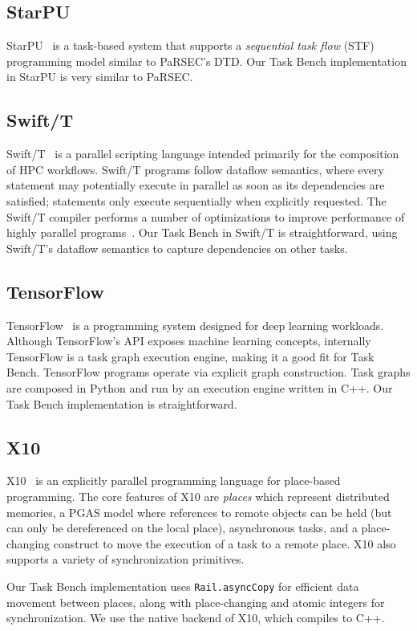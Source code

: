 \subsection{StarPU}

StarPU~\cite{StarPU11} is a task-based system that supports a \emph{sequential task flow} (STF)
programming model similar to PaRSEC's DTD. Our Task Bench implementation in
StarPU is very similar to PaRSEC.

\subsection{Swift/T}

Swift/T~\cite{Wozniak13} is a parallel scripting language intended
primarily for the composition of HPC workflows. Swift/T
programs follow dataflow semantics, where every statement may
potentially execute in parallel as soon as its dependencies are
satisfied; statements only execute sequentially when explicitly
requested. The Swift/T compiler performs a number of optimizations to
improve performance of highly parallel programs~\cite{Armstrong14}. Our Task Bench in Swift/T is straightforward, using Swift/T's dataflow
semantics to capture dependencies on other tasks.

\subsection{TensorFlow}

TensorFlow~\cite{TensorFlow15} is a programming system designed for
deep learning workloads. Although TensorFlow's API exposes
machine learning concepts, internally TensorFlow is a task graph execution engine, making it a good fit for
Task Bench. TensorFlow programs operate via explicit graph construction. Task graphs are composed in Python and run by an
execution engine written in C++. Our Task Bench implementation is straightforward.

\subsection{X10}

X10~\cite{X1005} is an explicitly parallel programming language for
place-based programming. The core features of X10 are \emph{places}
which represent distributed memories, a PGAS model where references to
remote objects can be held (but can only be dereferenced on the local
place), asynchronous tasks, and a place-changing construct to move the
execution of a task to a remote place. X10 also supports a variety of
synchronization primitives.

Our Task Bench implementation uses
\lstinline[language=X10]{Rail.asyncCopy} for efficient data movement
between places, along with place-changing and atomic integers for
synchronization. We use the native backend of X10, which compiles to
C++.
